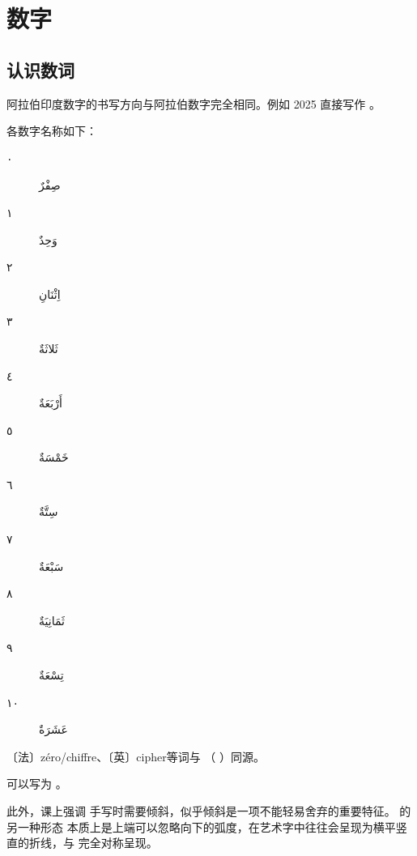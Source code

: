 \chapter{数字}

\section{认识数词}


阿拉伯印度数字的书写方向与阿拉伯数字完全相同。例如 2025 直接写作 。

各数字名称如下：

\begin{Arabic}
    \begin{multicols}{2}
    \begin{description}
        \item[٠] صِفْرٌ
        \item[١] وَحِدٌ
        \item[٢] اِثْنَانِ
        \item[٣] ثَلاثَةٌ
        \item[٤] أَرْبَعَةٌ
        \item[٥] خَمْسَةٌ
        \item[٦] سِتَّةٌ
        \item[٧] سَبْعَةٌ
        \item[٨] ثَمَانِيَةٌ
        \item[٩] تِسْعَةٌ
        \item[١٠] عَشَرَةٌ
    \end{description}
    \end{multicols}
\end{Arabic}

〔法〕zéro/chiffre、〔英〕cipher等词与 （  ）同源。

\newfontfamily{}

\begin{attention}
     可以写为 。
\end{attention}

\begin{note}
    此外，课上强调  手写时需要倾斜，似乎倾斜是一项不能轻易舍弃的重要特征。  的另一种形态  本质上是上端可以忽略向下的弧度，在艺术字中往往会呈现为横平竖直的折线，与  完全对称呈现。
\end{note}

